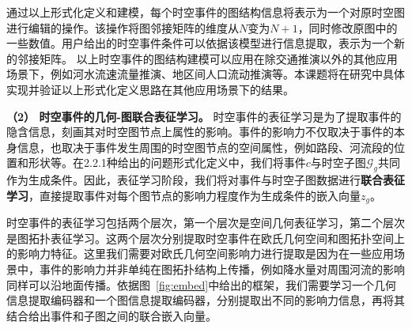 \documentclass[12pt,UTF8,AutoFakeBold=2,a4paper]{ctexart} %
\begin{document}
通过以上形式化定义和建模，每个时空事件的图结构信息将表示为一个对原时空图进行编辑的操作。该操作将图邻接矩阵的维度从$N$变为$N+1$，同时修改原图中的一些数值。用户给出的时空事件条件可以依据该模型进行信息提取，表示为一个新的邻接矩阵。%
以上时空事件的图结构建模可以应用在除交通推演以外的其他应用场景下，例如河水流速流量推演、地区间人口流动推演等。本课题将在研究中具体实现并验证以上形式化定义思路在其他应用场景下的结果。%

\textbf{（2） 时空事件的几何-图联合表征学习。}
时空事件的表征学习是为了提取事件的隐含信息，刻画其对时空图节点上属性的影响。事件的影响力不仅取决于事件的本身信息，也取决于事件发生周围的时空图节点的空间属性，例如路段、河流段的位置和形状等。在2.2.1种给出的问题形式化定义中，我们将事件$c$与时空子图$\mathcal{G}_g$共同作为生成条件。因此，表征学习阶段，我们将对事件与时空子图数据进行\textbf{联合表征学习}，直接提取事件对每个图节点的影响力程度作为生成条件的嵌入向量$z_g$。

时空事件的表征学习包括两个层次，第一个层次是空间几何表征学习，第二个层次是图拓扑表征学习。这两个层次分别提取时空事件在欧氏几何空间和图拓扑空间上的影响力特征。这里我们需要对欧氏几何空间影响力进行提取是因为在一些应用场景中，事件的影响力并非单纯在图拓扑结构上传播，例如降水量对周围河流的影响同样可以沿地面传播。依据图~\ref{fig:embed}中给出的框架，我们需要学习一个几何信息提取编码器和一个图信息提取编码器，分别提取出不同的影响力信息，再将其结合给出事件和子图之间的联合嵌入向量。
\end{document}
